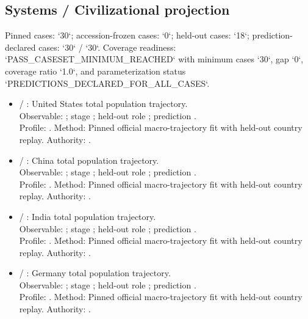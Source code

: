 \subsection{Systems / Civilizational projection}
Pinned cases: `30`; accession-frozen cases: `0`; held-out cases: `18`; prediction-declared cases: `30` / `30`.
Coverage readiness: `PASS\_CASESET\_MINIMUM\_REACHED` with minimum cases `30`, gap `0`, coverage ratio `1.0`, and parameterization status `PREDICTIONS\_DECLARED\_FOR\_ALL\_CASES`.
\begin{itemize}
\item {} / : United States total population trajectory.\\ Observable: ; stage ; held-out role ; prediction .\\ Profile: . Method: Pinned official macro-trajectory fit with held-out country replay. Authority: .
\item {} / : China total population trajectory.\\ Observable: ; stage ; held-out role ; prediction .\\ Profile: . Method: Pinned official macro-trajectory fit with held-out country replay. Authority: .
\item {} / : India total population trajectory.\\ Observable: ; stage ; held-out role ; prediction .\\ Profile: . Method: Pinned official macro-trajectory fit with held-out country replay. Authority: .
\item {} / : Germany total population trajectory.\\ Observable: ; stage ; held-out role ; prediction .\\ Profile: . Method: Pinned official macro-trajectory fit with held-out country replay. Authority: .

\end{itemize}
